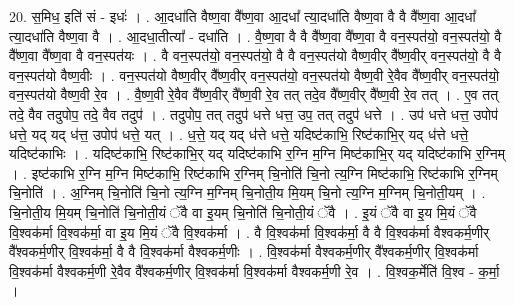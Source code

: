 \documentclass[17pt]{extarticle}
\begin{document}
20. स॒मिध॒ इति॑ सं - इधः॑ । . आ॒दधा॑ति वैष्ण॒वा वै᳚ष्ण॒वा आ॒दधा᳚ त्या॒दधा॑ति वैष्ण॒वा वै वै वै᳚ष्ण॒वा आ॒दधा᳚ त्या॒दधा॑ति वैष्ण॒वा वै । . आ॒दधा॒तीत्या᳚ - दधा॑ति । . वै॒ष्ण॒वा वै वै वै᳚ष्ण॒वा वै᳚ष्ण॒वा वै वन॒स्पत॑यो॒ वन॒स्पत॑यो॒ वै वै᳚ष्ण॒वा वै᳚ष्ण॒वा वै वन॒स्पत॑यः । . वै वन॒स्पत॑यो॒ वन॒स्पत॑यो॒ वै वै वन॒स्पत॑यो वैष्ण॒वीर् वै᳚ष्ण॒वीर् वन॒स्पत॑यो॒ वै वै वन॒स्पत॑यो वैष्ण॒वीः । . वन॒स्पत॑यो वैष्ण॒वीर् वै᳚ष्ण॒वीर् वन॒स्पत॑यो॒ वन॒स्पत॑यो वैष्ण॒वी रे॒वैव वै᳚ष्ण॒वीर् वन॒स्पत॑यो॒ वन॒स्पत॑यो वैष्ण॒वी रे॒व । . वै॒ष्ण॒वी रे॒वैव वै᳚ष्ण॒वीर् वै᳚ष्ण॒वी रे॒व तत् तदे॒व वै᳚ष्ण॒वीर् वै᳚ष्ण॒वी रे॒व तत् । . ए॒व तत् तदे॒ वैव तदुपोप॒ तदे॒ वैव तदुप॑ । . तदुपोप॒ तत् तदुप॑ धत्ते धत्त॒ उप॒ तत् तदुप॑ धत्ते । . उप॑ धत्ते धत्त॒ उपोप॑ धत्ते॒ यद् यद् ध॑त्त॒ उपोप॑ धत्ते॒ यत् । . ध॒त्ते॒ यद् यद् ध॑त्ते धत्ते॒ यदिष्ट॑काभि॒ रिष्ट॑काभि॒र् यद् ध॑त्ते धत्ते॒ यदिष्ट॑काभिः । . यदिष्ट॑काभि॒ रिष्ट॑काभि॒र् यद् यदिष्ट॑काभि र॒ग्नि म॒ग्नि मिष्ट॑काभि॒र् यद् यदिष्ट॑काभि र॒ग्निम् । . इष्ट॑काभि र॒ग्नि म॒ग्नि मिष्ट॑काभि॒ रिष्ट॑काभि र॒ग्निम् चि॒नोति॑ चि॒नो त्य॒ग्नि मिष्ट॑काभि॒ रिष्ट॑काभि र॒ग्निम् चि॒नोति॑ । . अ॒ग्निम् चि॒नोति॑ चि॒नो त्य॒ग्नि म॒ग्निम् चि॒नोती॒य मि॒यम् चि॒नो त्य॒ग्नि म॒ग्निम् चि॒नोती॒यम् । . चि॒नोती॒य मि॒यम् चि॒नोति॑ चि॒नोती॒यं ॅवै वा इ॒यम् चि॒नोति॑ चि॒नोती॒यं ॅवै । . इ॒यं ॅवै वा इ॒य मि॒यं ॅवै वि॒श्वक॑र्मा वि॒श्वक॑र्मा॒ वा इ॒य मि॒यं ॅवै वि॒श्वक॑र्मा । . वै वि॒श्वक॑र्मा वि॒श्वक॑र्मा॒ वै वै वि॒श्वक॑र्मा वैश्वकर्म॒णीर् वै᳚श्वकर्म॒णीर् वि॒श्वक॑र्मा॒ वै वै वि॒श्वक॑र्मा वैश्वकर्म॒णीः । . वि॒श्वक॑र्मा वैश्वकर्म॒णीर् वै᳚श्वकर्म॒णीर् वि॒श्वक॑र्मा वि॒श्वक॑र्मा वैश्वकर्म॒णी रे॒वैव वै᳚श्वकर्म॒णीर् वि॒श्वक॑र्मा वि॒श्वक॑र्मा वैश्वकर्म॒णी रे॒व । . वि॒श्वक॒र्मेति॑ वि॒श्व - क॒र्मा॒ । \newline
\end{document}
